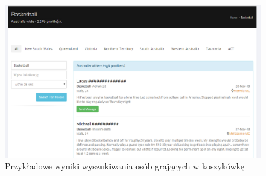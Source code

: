 \begin{figure}[H]
\centering
\includegraphics[width=\linewidth]{02-istniejace-rozwiazania/rys/ss-austr.PNG}
\caption{Przykładowe wyniki wyszukiwania osób grających w koszykówkę}
\label{fig:ss-austr}
\end{figure}